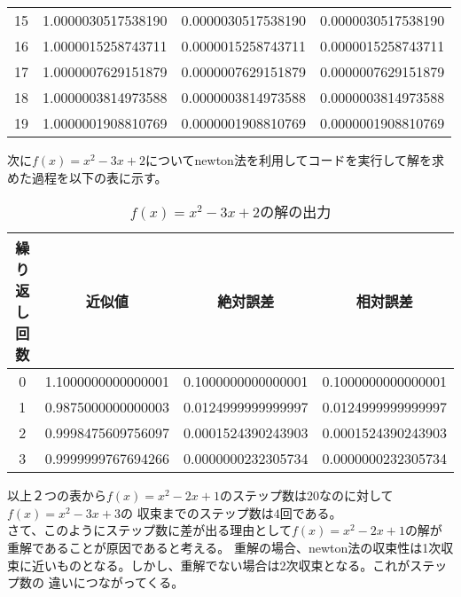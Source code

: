 \documentclass[uplatex,dvipdfmx,a4paper,10pt]{jsarticle}
\begin{document}
\begin{table}[H]
\begin{center}
\begin{tabular}{cccc}
                        15 & 1.0000030517538190 & 0.0000030517538190 & 0.0000030517538190 \\
                        16 & 1.0000015258743711 & 0.0000015258743711 & 0.0000015258743711 \\ 
                        17 & 1.0000007629151879 & 0.0000007629151879 & 0.0000007629151879 \\
                        18 & 1.0000003814973588 & 0.0000003814973588 & 0.0000003814973588 \\ 
                        19 & 1.0000001908810769 & 0.0000001908810769 & 0.0000001908810769 \\ \hline
                    \end{tabular}
                \end{center}
                \label{3-3-解の出力1}
            \end{table}

            次に$f(x) = x^2 - 3x + 2$についてnewton法を利用してコードを実行して解を求めた過程を以下の表に示す。

            \begin{table}[H]
                \begin{center}
                    \caption{$f(x) = x^2 - 3x + 2$の解の出力}
                    \begin{tabular}{cccc} \hline
                        繰り返し回数 & 近似値 & 絶対誤差 & 相対誤差 \\ \hline
                        0 & 1.1000000000000001 & 0.1000000000000001 & 0.1000000000000001 \\
                        1 & 0.9875000000000003 & 0.0124999999999997 & 0.0124999999999997 \\
                        2 & 0.9998475609756097 & 0.0001524390243903 & 0.0001524390243903 \\
                        3 & 0.9999999767694266 & 0.0000000232305734 & 0.0000000232305734 \\ \hline
                    \end{tabular}
                \end{center}
                \label{3-4-解の出力2}
            \end{table}

            以上２つの表から$f(x) = x^2 - 2x + 1$のステップ数は$20$なのに対して$f(x) = x^2 - 3x + 3$の
            収束までのステップ数は$4回$である。 \\
            \hspace{1em}さて、このようにステップ数に差が出る理由として$f(x) = x^2 - 2x + 1$の解が重解であることが原因であると考える。
            重解の場合、newton法の収束性は1次収束に近いものとなる。\cite{bi:1}しかし、重解でない場合は2次収束となる。これがステップ数の
            違いにつながってくる。
\end{document}
